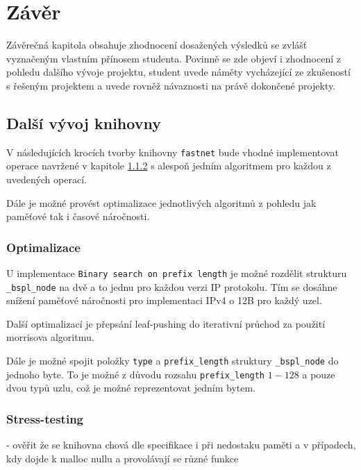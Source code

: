 \chapter{Závěr}\label{chapter:conclusion}
Závěrečná kapitola obsahuje zhodnocení dosažených výsledků se zvlášť vyznačeným vlastním přínosem studenta. Povinně se zde objeví i zhodnocení z pohledu dalšího vývoje projektu, student uvede náměty vycházející ze zkušeností s řešeným projektem a uvede rovněž návaznosti na právě dokončené projekty.


\section{Další vývoj knihovny}

V následujících krocích tvorby knihovny \texttt{fastnet} bude vhodné implementovat operace
navržené v kapitole \ref{} s alespoň jedním algoritmem pro každou z uvedených operací.

Dále je možné provést optimalizace jednotlivých algoritmů z pohledu jak paměťové tak i časové náročnosti.

\subsection{Optimalizace}
U implementace \texttt{Binary search on prefix length} je možné rozdělit strukturu \texttt{\_bspl\_node}
na dvě a to jednu pro každou verzi IP protokolu. Tím se dosáhne snížení paměťové náročnosti
pro implementaci IPv4 o 12B pro každý uzel.

Další optimalizací je přepsání leaf-pushing do iterativní průchod za použití morrisova algoritmu.

Dále je možné spojit položky \texttt{type} a \texttt{prefix\_length} struktury \texttt{\_bspl\_node}
do jednoho byte. To je možné z důvodu rozsahu \texttt{prefix\_length} $1-128$ a pouze dvou typů uzlu,
což je možné reprezentovat jedním bytem.

\subsection{Stress-testing}
- ověřit že se knihovna chová dle specifikace i při nedostaku paměti a v případech, kdy dojde k malloc nullu
a provolávají se různé funkce
